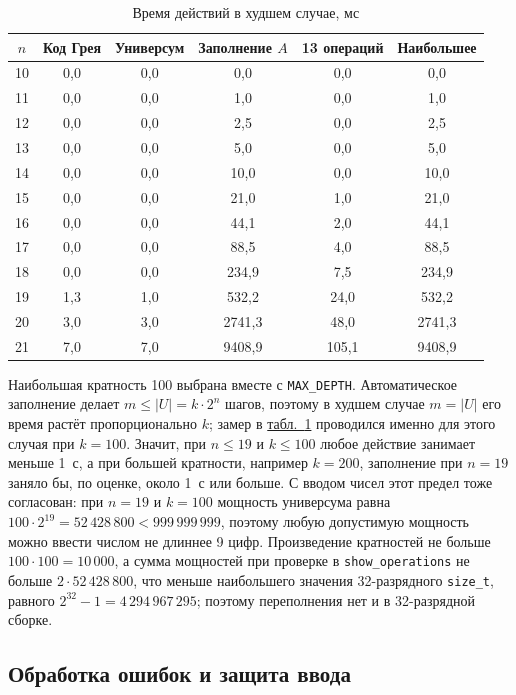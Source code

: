 \documentclass[14pt,a4paper]{extarticle}
\newcommand{\lnk}[2]{\hyperref[#1]{#2~\ref*{#1}}}
\newcommand{\tabref}[1]{\lnk{tab:#1}{табл.}}
\newcommand{\code}[1]{\texttt{#1}}
\newcommand{\us}{\_\allowbreak{}}
\begin{document}
\begin{table}[H]
\caption{Время действий в худшем случае, мс}\label{tab:bench}
\centering
\small
\begin{tabular}{|c|c|c|c|c|c|}
\hline
$n$ & Код Грея & Универсум & Заполнение $A$ & 13 операций & Наибольшее \\\hline
10 & 0,0 & 0,0 & 0,0 & 0,0 & 0,0 \\\hline
11 & 0,0 & 0,0 & 1,0 & 0,0 & 1,0 \\\hline
12 & 0,0 & 0,0 & 2,5 & 0,0 & 2,5 \\\hline
13 & 0,0 & 0,0 & 5,0 & 0,0 & 5,0 \\\hline
14 & 0,0 & 0,0 & 10,0 & 0,0 & 10,0 \\\hline
15 & 0,0 & 0,0 & 21,0 & 1,0 & 21,0 \\\hline
16 & 0,0 & 0,0 & 44,1 & 2,0 & 44,1 \\\hline
17 & 0,0 & 0,0 & 88,5 & 4,0 & 88,5 \\\hline
18 & 0,0 & 0,0 & 234,9 & 7,5 & 234,9 \\\hline
19 & 1,3 & 1,0 & 532,2 & 24,0 & 532,2 \\\hline
20 & 3,0 & 3,0 & 2741,3 & 48,0 & 2741,3 \\\hline
21 & 7,0 & 7,0 & 9408,9 & 105,1 & 9408,9 \\\hline
\end{tabular}
\end{table}

Наибольшая кратность 100 выбрана вместе с \code{MAX\us{}DEPTH}. Автоматическое заполнение делает $m \leqslant |U| = k \cdot 2^n$ шагов, поэтому в худшем случае $m = |U|$ его время растёт пропорционально $k$; замер в \tabref{bench} проводился именно для этого случая при $k = 100$. Значит, при $n \leqslant 19$ и $k \leqslant 100$ любое действие занимает меньше 1~с, а при большей кратности, например $k = 200$, заполнение при $n = 19$ заняло бы, по оценке, около 1~с или больше. С вводом чисел этот предел тоже согласован: при $n = 19$ и $k = 100$ мощность универсума равна $100 \cdot 2^{19} = 52\,428\,800 < 999\,999\,999$, поэтому любую допустимую мощность можно ввести числом не длиннее 9 цифр. Произведение кратностей не больше $100 \cdot 100 = 10\,000$, а сумма мощностей при проверке в \code{show\us{}operations} не больше $2 \cdot 52\,428\,800$, что меньше наибольшего значения 32-разрядного \code{size\us{}t}, равного $2^{32} - 1 = 4\,294\,967\,295$; поэтому переполнения нет и в 32-разрядной сборке.

\subsection{Обработка ошибок и защита ввода}
\end{document}
